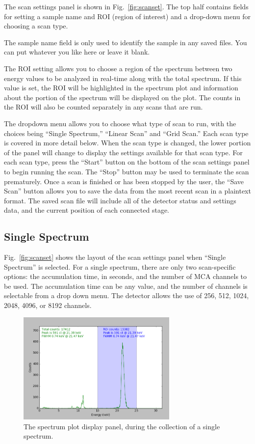 The scan settings panel is shown in Fig.~\ref{fig:scanset}. The top half contains fields for setting a sample name and ROI (region of interest) and a drop-down menu for choosing a scan type.

The sample name field is only used to identify the sample in any saved files. You can put whatever you like here or leave it blank.

The ROI setting allows you to choose a region of the spectrum between two energy values to be analyzed in real-time along with the total spectrum. If this value is set, the ROI will be highlighted in the spectrum plot and information about the portion of the spectrum will be displayed on the plot. The counts in the ROI will also be counted separately in any scans that are run.

The dropdown menu allows you to choose what type of scan to run, with the choices being ``Single Spectrum,'' ``Linear Scan'' and ``Grid Scan.'' Each scan type is covered in more detail below. When the scan type is changed, the lower portion of the panel will change to display the settings available for that scan type.
For each scan type, press the ``Start'' button on the bottom of the scan settings panel to begin running the scan. The ``Stop'' button may be used to terminate the scan prematurely. Once a scan is finished or has been stopped by the user, the ``Save Scan'' button allows you to save the data from the most recent scan in a plaintext format. The saved scan file will include all of the detector status and settings data, and the current position of each connected stage.

\subsection{Single Spectrum}

Fig.~\ref{fig:scanset} shows the layout of the scan settings panel when ``Single Spectrum'' is selected. For a single spectrum, there are only two scan-specific options: the accumulation time, in seconds, and the number of MCA channels to be used. The accumulation time can be any value, and the number of channels is selectable from a drop down menu. The detector allows the use of 256, 512, 1024, 2048, 4096, or 8192 channels.

\begin{figure}
\centering
\includegraphics[width=0.7\textwidth]{specplot.png}
\caption{\label{fig:specplot} The spectrum plot display panel, during the collection of a single spectrum.}
\end{figure}

